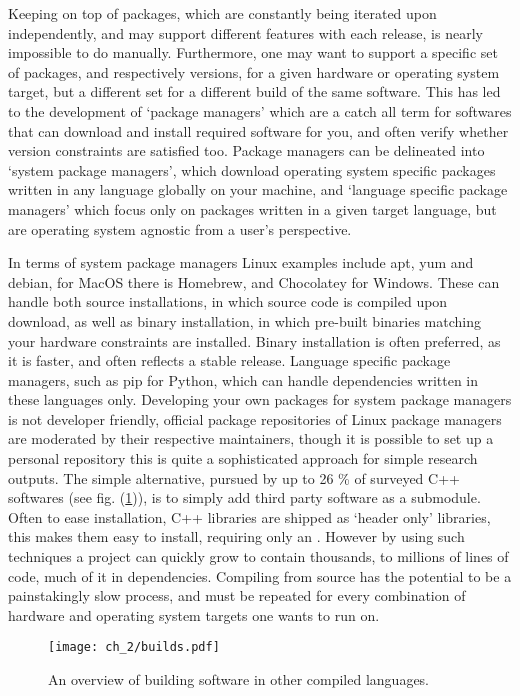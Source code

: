 Keeping on top of packages, which are constantly being iterated upon independently, and may support different features with each release, is nearly impossible to do manually. Furthermore, one may want to support a specific set of packages, and respectively versions, for a given hardware or operating system target, but a different set for a different build of the same software. This has led to the development of `package managers' which are a catch all term for softwares that can download and install required software for you, and often verify whether version constraints are satisfied too. Package managers can be delineated into `system package managers', which download operating system specific packages written in any language globally on your machine, and `language specific package managers' which focus only on packages written in a given target language, but are operating system agnostic from a user's perspective.

In terms of system package managers Linux examples include apt, yum and debian, for MacOS there is Homebrew, and Chocolatey for Windows. These can handle both source installations, in which source code is compiled upon download, as well as binary installation, in which pre-built binaries matching your hardware constraints are installed. Binary installation is often preferred, as it is faster, and often reflects a stable release. Language specific package managers, such as pip for Python, which can handle dependencies written in these languages only. Developing your own packages for system package managers is not developer friendly, official package repositories of Linux package managers are moderated by their respective maintainers, though it is possible to set up a personal repository this is quite a sophisticated approach for simple research outputs. The simple alternative, pursued by up to 26 \% of surveyed C++ softwares (see fig. (\ref{fig:sec_2_3:builds})), is to simply add third party software as a submodule. Often to ease installation, C++ libraries are shipped as `header only' libraries, this makes them easy to install, requiring only an . However by using such techniques a project can quickly grow to contain thousands, to millions of lines of code, much of it in dependencies. Compiling from source has the potential to be a painstakingly slow process, and must be repeated for every combination of hardware and operating system targets one wants to run on.

\begin{figure}
    \centerline{\texttt{[image: ch\_2/builds.pdf]}}
    \caption{An overview of building software in other compiled languages.}
    \label{fig:sec_2_3:builds}
\end{figure}

